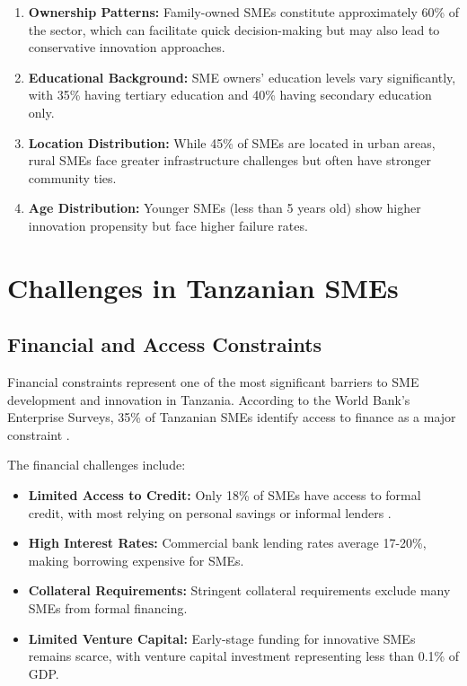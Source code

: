 \begin{enumerate}
    \item \textbf{Ownership Patterns:} Family-owned SMEs constitute approximately 60\% of the sector, which can facilitate quick decision-making but may also lead to conservative innovation approaches.
    \item \textbf{Educational Background:} SME owners' education levels vary significantly, with 35\% having tertiary education and 40\% having secondary education only.
    \item \textbf{Location Distribution:} While 45\% of SMEs are located in urban areas, rural SMEs face greater infrastructure challenges but often have stronger community ties.
    \item \textbf{Age Distribution:} Younger SMEs (less than 5 years old) show higher innovation propensity but face higher failure rates.
\end{enumerate}

\section{Challenges in Tanzanian SMEs}

\subsection{Financial and Access Constraints}

Financial constraints represent one of the most significant barriers to SME development and innovation in Tanzania. According to the World Bank's Enterprise Surveys, 35\% of Tanzanian SMEs identify access to finance as a major constraint \citep{worldbank2023enterprise}.

The financial challenges include:
\begin{itemize}
    \item \textbf{Limited Access to Credit:} Only 18\% of SMEs have access to formal credit, with most relying on personal savings or informal lenders \citep{ifc2020finance}.
    \item \textbf{High Interest Rates:} Commercial bank lending rates average 17-20\%, making borrowing expensive for SMEs.
    \item \textbf{Collateral Requirements:} Stringent collateral requirements exclude many SMEs from formal financing.
    \item \textbf{Limited Venture Capital:} Early-stage funding for innovative SMEs remains scarce, with venture capital investment representing less than 0.1\% of GDP.
\end{itemize}

